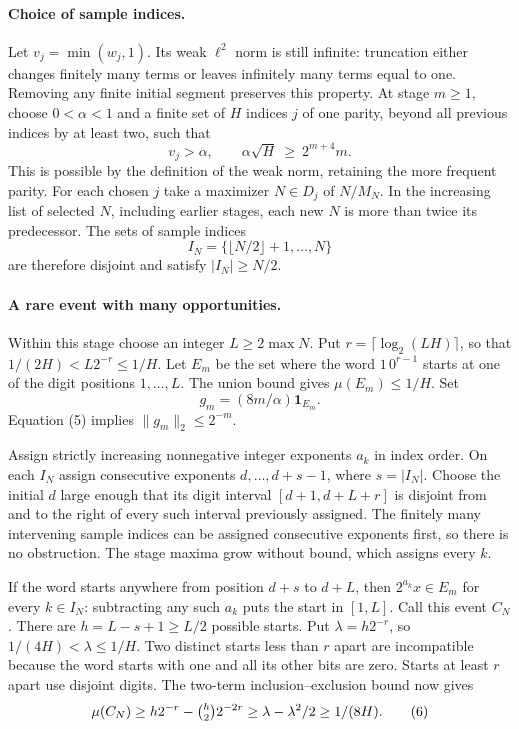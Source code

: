 \documentclass[11pt]{article}
\newcommand{\1}{\mathbf 1}
\begin{document}
\paragraph{Choice of sample indices.}
Let $v_j=\min(w_j,1)$. Its weak $\ell^2$ norm is still infinite: truncation
either changes finitely many terms or leaves infinitely many terms equal
to one. Removing any finite initial segment preserves this property.
At stage $m\ge1$, choose $0<\alpha<1$ and a finite set of $H$ indices
$j$ of one parity, beyond all previous indices by at least two, such that
\[
                v_j>\alpha,\qquad \alpha\sqrt H\ \ge\ 2^{m+4}m.       \tag{5}
\]
This is possible by the definition of the weak norm, retaining the more
frequent parity. For each chosen $j$ take a maximizer $N\in D_j$ of
$N/M_N$. In the increasing list of selected $N$, including earlier
stages, each new $N$ is more than twice its predecessor. The sets of
sample indices
\[
                     I_N=\{\lfloor N/2\rfloor+1,\ldots,N\}
\]
are therefore disjoint and satisfy $|I_N|\ge N/2$.

\paragraph{A rare event with many opportunities.}
Within this stage choose an integer $L\ge 2\max N$. Put $r=\lceil\log_2(LH)\rceil$,
so that $1/(2H)<L2^{-r}\le 1/H$. Let $E_m$ be the set where the
word $1\,0^{r-1}$ starts at one of the digit positions $1,\ldots,L$.
The union bound gives $\mu(E_m)\le 1/H$. Set
\[
                         g_m=(8m/\alpha)\1_{E_m}.
\]
Equation (5) implies $\|g_m\|_2\le 2^{-m}$.

Assign strictly increasing nonnegative integer exponents $a_k$ in index
order. On each $I_N$ assign consecutive exponents $d,\ldots,d+s-1$,
where $s=|I_N|$. Choose the initial $d$ large enough that its digit
interval $[d+1,d+L+r]$ is disjoint from and to the right of every
such interval previously assigned. The finitely many intervening sample
indices can be assigned consecutive exponents first, so there is no
obstruction. The stage maxima grow without bound, which assigns every $k$.

If the word starts anywhere from position $d+s$ to $d+L$, then
$2^{a_k}x\in E_m$ for every $k\in I_N$: subtracting any such $a_k$
puts the start in $[1,L]$. Call this event $C_N$. There are
$h=L-s+1\ge L/2$ possible starts. Put $\lambda=h2^{-r}$, so
$1/(4H)<\lambda\le 1/H$. Two distinct starts less than $r$ apart are
incompatible because the word starts with one and all its other bits
are zero. Starts at least $r$ apart use disjoint digits. The two-term
inclusion--exclusion bound now gives
\[
               \mu(C_N)\ge h2^{-r}-\tbinom h2 2^{-2r}
                          \ge\lambda-\lambda^2/2\ge 1/(8H).          \tag{6}
\]
\end{document}
